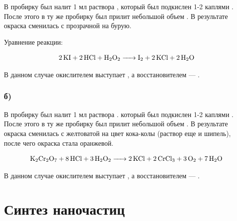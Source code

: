 \documentclass[a4paper, 12pt]{article}
\begin{document}
В пробирку был налит 1 мл раствора , который был подкислен 1-2 каплями . После этого в ту же пробирку был прилит небольшой объем . В результате окраска сменилась с прозрачной на бурую.

Уравнение реакции:

\begin{equation}
	\ce{2 KI + 2 HCl + H2O2 -> I2 + 2 KCl + 2H2O}
\end{equation}

В данном случае окислителем выступает , а восстановителем --- .

\subsubsection*{б)}

В пробирку был налит 1 мл раствора . который был подкислен 1-2 каплями . После этого в ту же пробирку был прилит небольшой объем . В результате окраска сменилась с желтоватой на цвет кока-колы (раствор еще и шипель), после чего окраска стала оранжевой.

\begin{equation}
	\ce{K2Cr2O7 + 8 HCl + 3 H2O2 -> 2KCl + 2CrCl3 + 3O2 + 7H2O}
\end{equation}

В данном случае окислителем выступает , а восстановителем --- .

\section{Синтез наночастиц }
\end{document}
